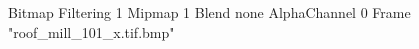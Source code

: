 {Bitmap
	{Filtering 1}
	{Mipmap 1}
	{Blend none}
	{AlphaChannel 0}
	{Frame "roof_mill_101_x.tif.bmp"}
}
